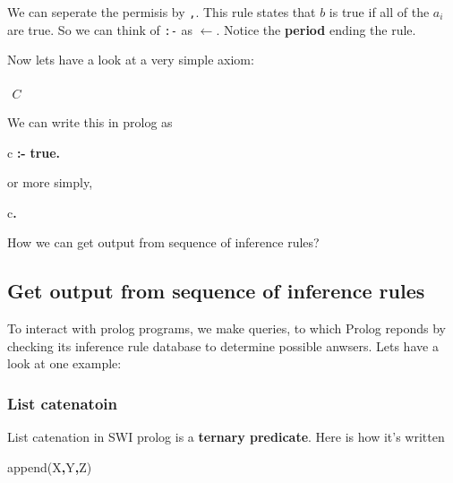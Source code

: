 \documentclass[11pt]{article}
\newenvironment{Shaded}{}{}
\newcommand{\KeywordTok}[1]{\textcolor[rgb]{0.00,0.44,0.13}{\textbf{{#1}}}}
\newcommand{\DataTypeTok}[1]{\textcolor[rgb]{0.56,0.13,0.00}{{#1}}}
\newcommand{\NormalTok}[1]{{#1}}
\begin{document}
    We can seperate the permisis by \texttt{,}. This rule states that \(b\)
is true if all of the \(a_i\) are true. So we can think of \texttt{:-}
as \(\leftarrow\). Notice the \textbf{period} ending the rule.

Now lets have a look at a very simple axiom:

\(\begin{array}{c}  \\  \hline  C  \end{array}\)

We can write this in prolog as

    \begin{Shaded}
\begin{Highlighting}[]
\NormalTok{c }\KeywordTok{:{-}} \KeywordTok{true.}
\end{Highlighting}
\end{Shaded}

or more simply,

\begin{Shaded}
\begin{Highlighting}[]
\NormalTok{c}\KeywordTok{.}
\end{Highlighting}
\end{Shaded}

    How we can get output from sequence of inference rules?

\hypertarget{get-output-from-sequence-of-inference-rules}{%
\subsection{Get output from sequence of inference
rules}\label{get-output-from-sequence-of-inference-rules}}

To interact with prolog programs, we make queries, to which Prolog
reponds by checking its inference rule database to determine possible
anwsers. Lets have a look at one example:

\hypertarget{list-catenatoin}{%
\subsubsection{List catenatoin}\label{list-catenatoin}}

List catenation in SWI prolog is a \textbf{ternary predicate}. Here is
how it's written

\begin{Shaded}
\begin{Highlighting}[]
\NormalTok{append(}\DataTypeTok{X}\KeywordTok{,}\DataTypeTok{Y}\KeywordTok{,}\DataTypeTok{Z}\NormalTok{)}
\end{Highlighting}
\end{Shaded}
\end{document}
